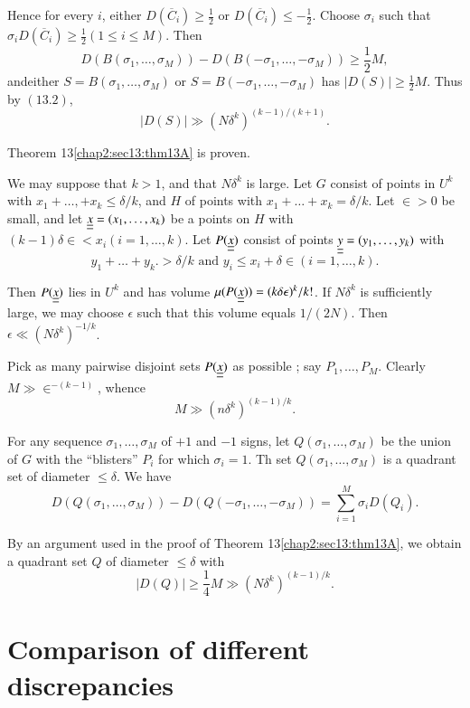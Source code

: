 Hence for every $i$, either $D(\overline{C}_{i}) \geq \frac{1}{2}$ or $D(\overline{C}_{i}) \leq - \frac{1}{2}$. Choose $\sigma_{i}$ such that $\sigma_{i} D(\overline{C}_{i}) \geq \frac{1}{2} (1 \leq i \leq M)$. Then
$$
D(B(\sigma_{1}, \ldots, \sigma_{M})) -D(B(-\sigma_{1}, \ldots, -\sigma_{M})) \geq \frac{1}{2} M,
$$
and\pageoriginale either $S = B(\sigma_{1}, \ldots, \sigma_{M})$ or $S = B(-\sigma_{1}, \ldots, -\sigma_{M})$ has $|D(S)| \geq \frac{1}{2} M$. Thus by $(13.2)$,
$$
|D(S)| \gg (N \delta^{k})^{(k-1)/(k+1)}.
$$

Theorem 13\ref{chap2:sec13:thm13A} is proven.

\medskip
{} We may suppose that $k > 1$, and that $N \delta^{k}$ is large. Let $G$ consist of points in $U^{k}$ with $x_{1} + \ldots, +x_{k} \leq \delta/k$, and $H$ of points with $x_{1} + \ldots + x_{k} = \delta/k$. Let $\in > 0$ be small, and let $\underline{\underline{x}} = (x_{1}, \ldots, x_{k})$ be a points on $H$ with $(k-1) \delta \in < x_{i} (i=1, \ldots, k)$. Let $P(\underline{\underline{x}})$ consist of points $\underline{\underline{y}} = (y_{1}, \ldots, y_{k})$ with
$$
y_{1} + \ldots +y_{k} . >\delta/k \text{ and } y_{i} \leq x_{i} + \delta \in (i = 1, \ldots, k).
$$

Then $P(\underline{\underline{x}})$ lies in $U^{k}$ and has volume $\mu (P(\underline{\underline{x}})) =
(k \delta \epsilon)^{k}/k!$. If $N \delta^{k}$ is sufficiently large,
we may choose $\epsilon$ such that this volume equals $1/(2N)$. Then
$\epsilon \ll (N \delta^{k})^{-1/k}$. 

Pick as many pairwise disjoint sets $P(\underline{\underline{x}})$ as possible ; say
$P_{1}, \ldots, P_{M}$. Clearly $M \gg \in^{-(k-1)}$, whence 
$$
M \gg (n \delta^{k})^{(k-1)/k}.
$$

For any sequence $\sigma_{1}, \ldots, \sigma_{M}$ of $+1$ and $-1$ signs, let $Q(\sigma_{1}, \ldots, \sigma_{M})$ be the union of $G$ with the ``blisters'' $P_{i}$ for which $\sigma_{i} = 1$. Th set $Q(\sigma_{1}, \ldots, \sigma_{M})$ is a quadrant set of diameter $\leq \delta$. We have
$$
D(Q(\sigma_{1}, \ldots, \sigma_{M})) - D(Q(-\sigma_{1}, \ldots, -\sigma_{M})) = \sum_{i=1}^{M} \sigma_{i} D(Q_{i}).
$$

By an argument used in the proof of Theorem 13\ref{chap2:sec13:thm13A}, we obtain a quadrant set $Q$ of diameter $\leq \delta$ with
$$
|D(Q)| \geq \frac{1}{4} M \gg (N \delta^{k})^{(k-1)/k}.
$$

\section{Comparison of different discrepancies}\label{chap2:sec14}

